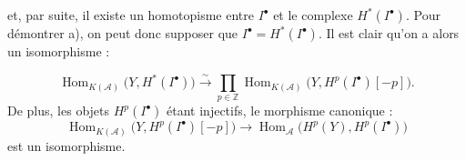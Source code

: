 et, par suite, il existe un homotopisme entre $I^\bullet$ et le complexe
$H^*(I^\bullet)$. Pour démontrer a), on peut donc supposer que
$I^\bullet=H^*(I^\bullet)$. Il est clair qu'on a alors un isomorphisme :

\[
\operatorname{Hom}_{K(\mathcal A)}\bigl(Y,H^*(I^\bullet)\bigr)
\xrightarrow{\sim}
\prod_{p\in\mathbb Z}
\operatorname{Hom}_{K(\mathcal A)}
\bigl(Y,H^p(I^\bullet)[-p]\bigr).
\]
De plus, les objets $H^p(I^\bullet)$ étant injectifs, le morphisme
canonique :
\[
\operatorname{Hom}_{K(\mathcal A)}
\bigl(Y,H^p(I^\bullet)[-p]\bigr)
\longrightarrow
\operatorname{Hom}_{\mathcal A}\bigl(H^p(Y),H^p(I^\bullet)\bigr)
\]
est un isomorphisme.
\endgroup

